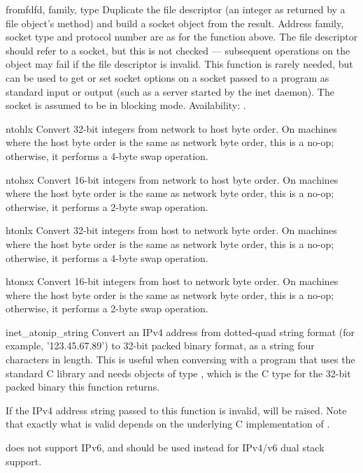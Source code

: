 \begin{funcdesc}{fromfd}{fd, family, type}
Duplicate the file descriptor  (an integer as returned by a file
object's  method) and build a socket object from the
result.  Address family, socket type and protocol number are as for the
 function above.
The file descriptor should refer to a socket, but this is not
checked --- subsequent operations on the object may fail if the file
descriptor is invalid.  This function is rarely needed, but can be
used to get or set socket options on a socket passed to a program as
standard input or output (such as a server started by the \UNIX{} inet
daemon).  The socket is assumed to be in blocking mode.
Availability: \UNIX.
\end{funcdesc}

\begin{funcdesc}{ntohl}{x}
Convert 32-bit integers from network to host byte order.  On machines
where the host byte order is the same as network byte order, this is a
no-op; otherwise, it performs a 4-byte swap operation.
\end{funcdesc}

\begin{funcdesc}{ntohs}{x}
Convert 16-bit integers from network to host byte order.  On machines
where the host byte order is the same as network byte order, this is a
no-op; otherwise, it performs a 2-byte swap operation.
\end{funcdesc}

\begin{funcdesc}{htonl}{x}
Convert 32-bit integers from host to network byte order.  On machines
where the host byte order is the same as network byte order, this is a
no-op; otherwise, it performs a 4-byte swap operation.
\end{funcdesc}

\begin{funcdesc}{htons}{x}
Convert 16-bit integers from host to network byte order.  On machines
where the host byte order is the same as network byte order, this is a
no-op; otherwise, it performs a 2-byte swap operation.
\end{funcdesc}

\begin{funcdesc}{inet_aton}{ip_string}
Convert an IPv4 address from dotted-quad string format (for example,
'123.45.67.89') to 32-bit packed binary format, as a string four
characters in length.  This is useful when conversing with a program
that uses the standard C library and needs objects of type
, which is the C type for the 32-bit packed
binary this function returns.

If the IPv4 address string passed to this function is invalid,
 will be raised. Note that exactly what is
valid depends on the underlying C implementation of
.

 does not support IPv6, and
 should be used instead for IPv4/v6 dual stack
support.
\end{funcdesc}

